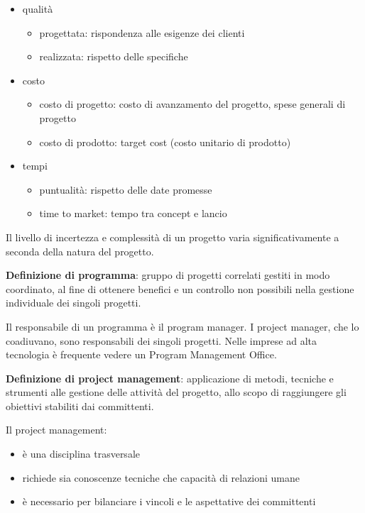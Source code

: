 \documentclass[answers, a4paper, 11pt]{exam}
\begin{document}
\begin{itemize}
    \item qualità
    \begin{itemize}
        \item progettata: rispondenza alle esigenze dei clienti
        \item realizzata: rispetto delle specifiche
    \end{itemize}
    \item costo
    \begin{itemize}
        \item costo di progetto: costo di avanzamento del progetto, spese generali di progetto
        \item costo di prodotto: target cost (costo unitario di prodotto)
    \end{itemize}
    \item tempi
    \begin{itemize}
        \item puntualità: rispetto delle date promesse
        \item time to market: tempo tra concept e lancio
    \end{itemize}
\end{itemize}

Il livello di incertezza e complessità di un progetto varia significativamente a seconda della natura del progetto.

\textbf{Definizione di programma}: gruppo di progetti correlati gestiti in modo coordinato, al fine di ottenere benefici e un controllo non possibili nella gestione individuale dei singoli progetti.

Il responsabile di un programma è il program manager.
I project manager, che lo coadiuvano, sono responsabili dei singoli progetti.
Nelle imprese ad alta tecnologia è frequente vedere un Program Management Office. 

\textbf{Definizione di project management}: applicazione di metodi, tecniche e strumenti alle gestione delle attività del progetto, allo scopo di raggiungere gli obiettivi stabiliti dai committenti.

Il project management:

\begin{itemize}
    \item è una disciplina trasversale
    \item richiede sia conoscenze tecniche che capacità di relazioni umane
    \item è necessario per bilanciare i vincoli e le aspettative dei committenti
\end{itemize}
\end{document}
